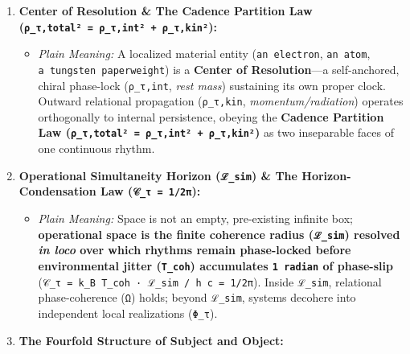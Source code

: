 \documentclass[
]{article}
\providecommand{\tightlist}{%
  \setlength{\itemsep}{0pt}\setlength{\parskip}{0pt}}
\begin{document}
\begin{enumerate}
  \begin{itemize}
  \tightlist
  \item
    \emph{Plain Meaning:} Not a halting ``selection switch,'' but the
    continuous, irreversible cresting of the dialectic by which
    relational potentiality (\texttt{Ω}) crystallizes into realized
    actuality (\texttt{Y}), advancing the discrete ordinal index of
    realized resolutions (\texttt{ν~→~ν~+~1}). Because every
    actualization permanently imprints a conserved relational
    determination onto \texttt{Y}, no resolution can ever be un-done
    (\texttt{strict~ordinal~irreversibility}).
  \end{itemize}
\item
  \textbf{Center of Resolution \& The Cadence Partition Law
  (\texttt{ρ\_τ,total²~=~ρ\_τ,int²~+~ρ\_τ,kin²}):}

  \begin{itemize}
  \tightlist
  \item
    \emph{Plain Meaning:} A localized material entity
    (\texttt{an~electron}, \texttt{an~atom},
    \texttt{a~tungsten~paperweight}) is a \textbf{Center of
    Resolution}---a self-anchored, chiral phase-lock (\texttt{ρ\_τ,int},
    \emph{rest mass}) sustaining its own proper clock. Outward
    relational propagation (\texttt{ρ\_τ,kin},
    \emph{momentum/radiation}) operates orthogonally to internal
    persistence, obeying the \textbf{Cadence Partition Law
    (\texttt{ρ\_τ,total²~=~ρ\_τ,int²~+~ρ\_τ,kin²})} as two inseparable
    faces of one continuous rhythm.
  \end{itemize}
\item
  \textbf{Operational Simultaneity Horizon (\texttt{ℒ\_sim}) \& The
  Horizon-Condensation Law (\texttt{𝒞\_τ~=~1/2π}):}

  \begin{itemize}
  \tightlist
  \item
    \emph{Plain Meaning:} Space is not an empty, pre-existing infinite
    box; \textbf{operational space is the finite coherence radius
    (\texttt{ℒ\_sim}) resolved \emph{in loco} over which rhythms remain
    phase-locked before environmental jitter (\texttt{T\_coh})
    accumulates \texttt{1~radian} of phase-slip}
    (\texttt{𝒞\_τ~=~k\_B~T\_coh~·~ℒ\_sim~/~h~c~=~1/2π}). Inside
    \texttt{ℒ\_sim}, relational phase-coherence (\texttt{Ω}) holds;
    beyond \texttt{ℒ\_sim}, systems decohere into independent local
    realizations (\texttt{Φ\_τ}).
  \end{itemize}
\item
  \textbf{The Fourfold Structure of Subject and Object:}


\end{enumerate}
\end{document}
